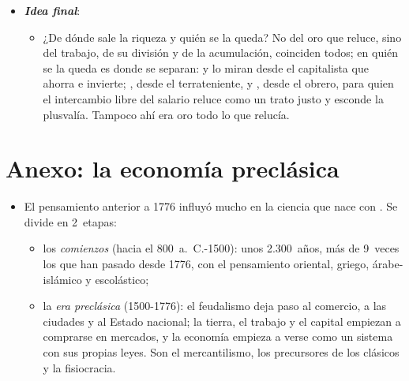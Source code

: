 \documentclass[11pt]{article}
\begin{document}
\begin{itemize}
\begin{itemize}
  \item Pero su pregunta por el reparto ha vuelto al centro con el debate sobre la desigualdad, y sus ideas, del librecambio a la ventaja comparativa, siguen guiando la política. Lo dijo  en 1936: «los hombres prácticos, que se creen libres de toda influencia intelectual, suelen ser esclavos de algún economista difunto».\footnote{En el original: «Practical men, who believe themselves to be quite exempt from any intellectual influences, are usually the slaves of some defunct economist», en el capítulo~24~de la \emph{Teoría general}\nocite{Keynes1936}.}
  \end{itemize}
\item \textbf{\emph{Idea final}}:
  \begin{itemize}
  \item ¿De dónde sale la riqueza y quién se la queda? No del oro que reluce, sino del trabajo, de su división y de la acumulación, coinciden todos; en quién se la queda es donde se separan:  y  lo miran desde el capitalista que ahorra e invierte; , desde el terrateniente, y , desde el obrero, para quien el intercambio libre del salario reluce como un trato justo y esconde la plusvalía. Tampoco ahí era oro todo lo que relucía.
  \end{itemize}
\end{itemize}


\clearpage
\appendix

\section{Anexo: la economía preclásica}\label{anexo:preclasica}

\begin{itemize}
\item El pensamiento anterior a 1776 influyó mucho en la ciencia que nace con . Se divide en 2~etapas\nocite{LandrethColander2006Historia}:
  \begin{itemize}
  \item los \emph{comienzos} (hacia el 800~a.~C.-1500): unos 2.300~años, más de 9~veces los que han pasado desde 1776, con el pensamiento oriental, griego, árabe-islámico y escolástico;
  \item la \emph{era preclásica} (1500-1776): el feudalismo deja paso al comercio, a las ciudades y al Estado nacional; la tierra, el trabajo y el capital empiezan a comprarse en mercados, y la economía empieza a verse como un sistema con sus propias leyes. Son el mercantilismo, los precursores de los clásicos y la fisiocracia.
  \end{itemize}
\end{itemize}
\end{document}
